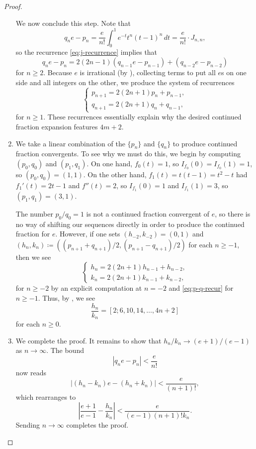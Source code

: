 \documentclass[../notes.tex]{subfiles}
\begin{document}
\begin{proof}
\begin{enumerate}
		We now conclude this step. Note that
		\[q_ne-p_n=\frac e{n!}\int_0^1e^{-t}t^n(t-1)^n\,dt=\frac e{n!}\cdot J_{n,n},\]
		so the recurrence \eqref{eq:j-recurrence} implies that
		\[q_ne-p_n=2(2n-1)(q_{n-1}e-p_{n-1})+(q_{n-2}e-p_{n-2})\]
		for $n\ge2$. Because $e$ is irrational (by ), collecting terms to put all $e$s on one side and all integers on the other, we produce the system of recurrences
		\begin{equation}
			\begin{cases}
				p_{n+1}=2(2n+1)p_n+p_{n-1}, \\
				q_{n+1}=2(2n+1)q_n+q_{n-1},
			\end{cases} \label{eq:p-q-recur}
		\end{equation}
		for $n\ge1$. These recurrences essentially explain why the desired continued fraction expansion features $4m+2$.

		\item We take a linear combination of the $\{p_n\}$ and $\{q_n\}$ to produce continued fraction convergents. To see why we must do this, we begin by computing $(p_0,q_0)$ and $(p_1,q_1)$. On one hand, $f_0(t)=1$, so $I_{f_0}(0)=I_{f_0}(1)=1$, so $(p_0,q_0)=(1,1)$. On the other hand, $f_1(t)=t(t-1)=t^2-t$ had $f_1'(t)=2t-1$ and $f''(t)=2$, so $I_{f_1}(0)=1$ and $I_{f_1}(1)=3$, so $(p_1,q_1)=(3,1)$.

		The number $p_0/q_0=1$ is not a continued fraction convergent of $e$, so there is no way of shifting our sequences directly in order to produce the continued fraction for $e$. However, if one sets $(h_{-2},k_{-2})=(0,1)$ and $(h_n,k_n)\coloneqq((p_{n+1}+q_{n+1})/2,(p_{n+1}-q_{n+1})/2)$ for each $n\ge-1$, then we see
		\[\begin{cases}
			h_n=2(2n+1)h_{n-1}+h_{n-2}, \\
			k_n=2(2n+1)k_{n-1}+k_{n-2},
		\end{cases}\]
		for $n\ge-2$ by an explicit computation at $n=-2$ and \eqref{eq:p-q-recur} for $n\ge-1$. Thus, by , we see
		\[\frac{h_n}{k_n}=[2;6,10,14,\ldots,4n+2]\]
		for each $n\ge0$.

		\item We complete the proof. It remains to show that $h_n/k_n\to(e+1)/(e-1)$ as $n\to\infty$. The bound
		\[\left|q_ne-p_n\right|<\frac e{n!}\]
		now reads
		\[\left|(h_n-k_n)e-(h_n+k_n)\right|<\frac e{(n+1)!},\]
		which rearranges to
		\[\left|\frac{e+1}{e-1}-\frac{h_n}{k_n}\right|<\frac e{(e-1)(n+1)!k_n}.\]
		Sending $n\to\infty$ completes the proof.
		\qedhere
	\end{enumerate}
\end{proof}
\end{document}
